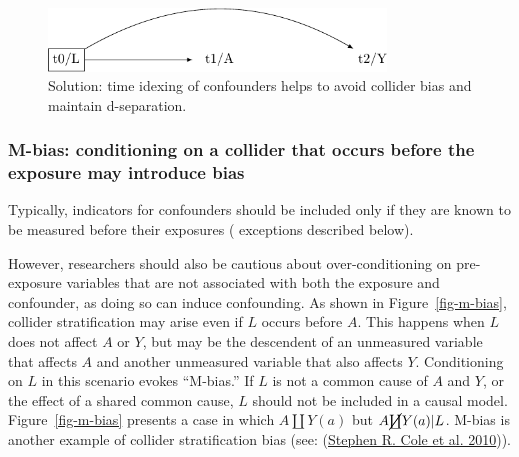\documentclass[
  singlecolumn]{article}
\begin{document}
\begin{figure}

{\centering \includegraphics[width=0.8\textwidth,height=\textheight]{causal-dags_files/figure-pdf/fig-dag-common-effect-solution-1.pdf}

}

\caption{\label{fig-dag-common-effect-solution}Solution: time idexing of
confounders helps to avoid collider bias and maintain d-separation.}

\end{figure}

\hypertarget{m-bias-conditioning-on-a-collider-that-occurs-before-the-exposure-may-introduce-bias}{%
\subsubsection{M-bias: conditioning on a collider that occurs before the
exposure may introduce
bias}\label{m-bias-conditioning-on-a-collider-that-occurs-before-the-exposure-may-introduce-bias}}

Typically, indicators for confounders should be included only if they
are known to be measured before their exposures ( exceptions described
below).

However, researchers should also be cautious about over-conditioning on
pre-exposure variables that are not associated with both the exposure
and confounder, as doing so can induce confounding. As shown in
Figure~\ref{fig-m-bias}, collider stratification may arise even if \(L\)
occurs before \(A\). This happens when \(L\) does not affect \(A\) or
\(Y\), but may be the descendent of an unmeasured variable that affects
\(A\) and another unmeasured variable that also affects \(Y\).
Conditioning on \(L\) in this scenario evokes ``M-bias.'' If \(L\) is
not a common cause of \(A\) and \(Y\), or the effect of a shared common
cause, \(L\) should not be included in a causal model.
Figure~\ref{fig-m-bias} presents a case in which \(A \coprod Y(a)\) but
\(A \cancel{\coprod} Y(a)| L\). M-bias is another example of collider
stratification bias (see: (\protect\hyperlink{ref-cole2010}{Stephen R.
Cole et al. 2010})).
\end{document}
